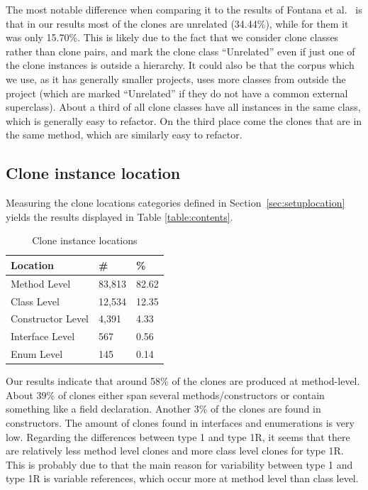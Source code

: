 The most notable difference when comparing it to the results of Fontana et al.~\cite{fontana2015duplicated} is that in our results most of the clones are unrelated (34.44\%), while for them it was only 15.70\%. This is likely due to the fact that we consider clone classes rather than clone pairs, and mark the clone class ``Unrelated'' even if just one of the clone instances is outside a hierarchy. It could also be that the corpus which we use, as it has generally smaller projects, uses more classes from outside the project (which are marked ``Unrelated'' if they do not have a common external superclass). About a third of all clone classes have all instances in the same class, which is generally easy to refactor. On the third place come the clones that are in the same method, which are similarly easy to refactor.

\subsection{Clone instance location}\label{chap:clonelocation}
Measuring the clone locations categories defined in Section~\ref{sec:setuplocation} yields the results displayed in Table \ref{table:contents}.

\begin{table}[H]
  \begin{center}
  \caption{Clone instance locations} \label{table:locations}
  \medskip
\begin{tabular}{|l|l|l|}
\hline
\textbf{Location}   & \textbf{\#} & \textbf{\%} \\ \hline
Method Level        & 83,813 & 82.62            \\ \hline
Class Level        & 12,534 & 12.35            \\ \hline
Constructor Level    & 4,391 & 4.33           \\ \hline
Interface Level   & 567 & 0.56           \\ \hline
Enum Level         & 145 & 0.14            \\ \hline
\end{tabular}
\end{center}
\end{table}

Our results indicate that around 58\% of the clones are produced at method-level. About 39\% of clones either span several methods/constructors or contain something like a field declaration. Another 3\% of the clones are found in constructors. The amount of clones found in interfaces and enumerations is very low. Regarding the differences between type 1 and type 1R, it seems that there are relatively less method level clones and more class level clones for type 1R. This is probably due to that the main reason for variability between type 1 and type 1R is variable references, which occur more at method level than class level.

